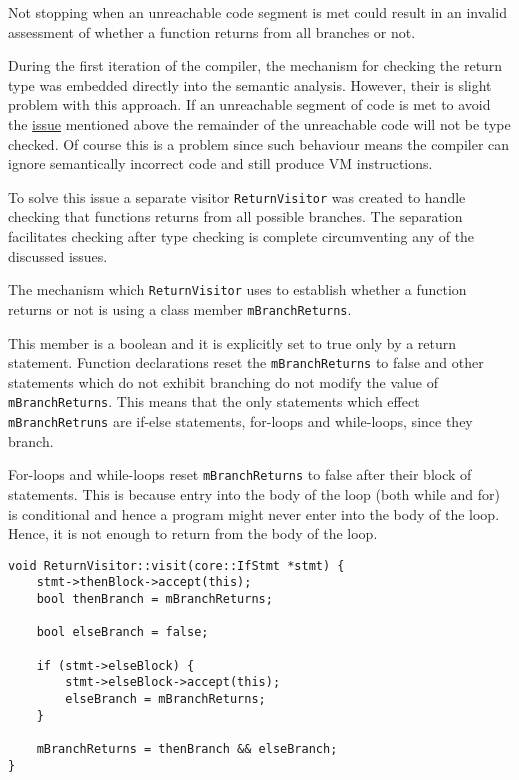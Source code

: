 \begin{marker}
\label{sss:returnissue} Not stopping when an unreachable code
segment is met could result in an invalid assessment of whether
a function returns from all branches or not.
\end{marker}

During the first iteration of the compiler, the mechanism for
checking the return type was embedded directly into the semantic
analysis. However, their is slight problem with this approach.
If an unreachable segment of code is met to avoid the
\hyperref[sss:returnissue]{issue} mentioned above the remainder
of the unreachable code will not be type checked. Of course this
is a problem since such behaviour means the compiler can ignore
semantically incorrect code and still produce VM instructions.

To solve this issue a separate visitor \texttt{ReturnVisitor}
was created to handle checking that functions returns from all
possible branches. The separation facilitates checking after
type checking is complete circumventing any of the discussed
issues.

The mechanism which \texttt{ReturnVisitor} uses to establish
whether a function returns or not is using a class member
\texttt{mBranchReturns}.

This member is a boolean and it is explicitly set to true only
by a return statement. Function declarations reset the
\texttt{mBranchReturns} to false and other statements which do
not exhibit branching do not modify the value of
\texttt{mBranchReturns}. This means that the only statements
which effect \texttt{mBranchRetruns} are if-else statements,
for-loops and while-loops, since they branch.

For-loops and while-loops reset \texttt{mBranchReturns} to false
after their block of statements. This is because entry into the
body of the loop (both while and for) is conditional and hence a
program might never enter into the body of the loop. Hence, it
is not enough to return from the body of the loop.

\begin{lstlisting}[caption={The \texttt{visit(IfStmt *)} method
in the \texttt{ReturnVisitor} class
(analysis/ReturnVisitor.cpp)},label=lst:iftypecheck]
void ReturnVisitor::visit(core::IfStmt *stmt) {
    stmt->thenBlock->accept(this);
    bool thenBranch = mBranchReturns;

    bool elseBranch = false;

    if (stmt->elseBlock) {
        stmt->elseBlock->accept(this);
        elseBranch = mBranchReturns;
    }

    mBranchReturns = thenBranch && elseBranch;
}
\end{lstlisting}

